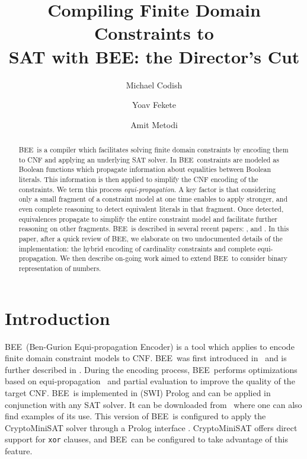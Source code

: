 \documentclass[runningheads,a4paper]{llncs}
\newcommand{\bee}{\textsf{BEE}}
\begin{document}
\title{Compiling Finite Domain
  Constraints to\\ SAT with \bee: the Director's Cut}  


\author{Michael Codish\and Yoav Fekete\and Amit Metodi}


\maketitle
\label{firstpage}


\begin{abstract}
\bee\ is a compiler which facilitates solving finite domain
  constraints by encoding them to CNF and applying an underlying SAT
  solver. In \bee\ constraints are modeled as Boolean functions which
  propagate information about equalities between Boolean literals.
  This information is then applied to simplify the CNF encoding of the
  constraints. We term this process \emph{equi-propagation}.
A key factor is that considering only a small fragment of a
  constraint model at one time enables to apply stronger, and even
  complete reasoning to detect equivalent literals in that
  fragment. Once detected, equivalences propagate to simplify the
  entire constraint model and facilitate further reasoning on other
  fragments.
\bee\ is described in several recent papers: \cite{Metodi2011},
  \cite{bee2012} and \cite{jair2013}.
In this paper, after a quick review of \bee, we elaborate on two
  undocumented details of the implementation: the hybrid encoding of
  cardinality constraints and complete equi-propagation. We then
  describe on-going work aimed to extend \bee\ to consider binary
  representation of numbers.
\end{abstract}

\section{Introduction}


\bee\ (Ben-Gurion Equi-propagation Encoder) is a tool which applies to
encode finite domain constraint models to CNF. \bee\ was first
introduced in~\cite{bee2012} and is further described in
\cite{jair2013}.  During the encoding process, \bee\ performs
optimizations based on equi-propagation~\cite{Metodi2011} and partial
evaluation to improve the quality of the target CNF.
\bee\ is implemented in (SWI) Prolog and can be applied in conjunction
with any SAT solver. It can be downloaded from~\cite{bee2012web} where
one can also find examples of its use. This version of \bee\ is
configured to apply the CryptoMiniSAT solver \cite{Crypto} through a
Prolog interface \cite{satPearl}. CryptoMiniSAT offers direct support
for \texttt{xor} clauses, and \bee\ can be configured to take
advantage of this feature.
\end{document}
